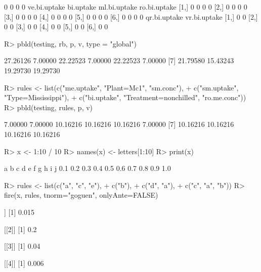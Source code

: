 \documentclass{article}\usepackage[]{graphicx}\usepackage[]{color}
\begin{document}
\begin{Schunk}
\begin{Soutput}
[6,]            0            0            0            0
     ve.bi.uptake bi.uptake ml.bi.uptake ro.bi.uptake
[1,]            0         0            0            0
[2,]            0         0            0            0
[3,]            0         0            0            0
[4,]            0         0            0            0
[5,]            0         0            0            0
[6,]            0         0            0            0
     qr.bi.uptake vr.bi.uptake
[1,]            0            0
[2,]            0            0
[3,]            0            0
[4,]            0            0
[5,]            0            0
[6,]            0            0
\end{Soutput}
%
% --end: "pbld5"
\end{Schunk}

\begin{Schunk}
% --begin: "pbld6"
\begin{Sinput}
R> pbld(testing, rb, p, v, type = "global")
\end{Sinput}
\begin{Soutput}
 [1] 27.26126  7.00000 22.22523  7.00000 22.22523  7.00000
 [7] 21.79580 15.43243 19.29730 19.29730
\end{Soutput}
%
% --end: "pbld6"
\end{Schunk}

\begin{Schunk}
% --begin: "pbld_custom"
\begin{Sinput}
R> rules <- list(c("me.uptake", "Plant=Mc1", "sm.conc"),
+                c("sm.uptake", "Type=Mississippi"),
+                c("bi.uptake", "Treatment=nonchilled", "ro.me.conc"))
R> pbld(testing, rules, p, v)
\end{Sinput}
\begin{Soutput}
 [1]  7.00000  7.00000 10.16216 10.16216 10.16216  7.00000
 [7] 10.16216 10.16216 10.16216 10.16216
\end{Soutput}
%
% --end: "pbld_custom"
\end{Schunk}

\begin{Schunk}
% --begin: "fire"
\begin{Sinput}
R> x <- 1:10 / 10
R> names(x) <- letters[1:10]
R> print(x)
\end{Sinput}
\begin{Soutput}
  a   b   c   d   e   f   g   h   i   j 
0.1 0.2 0.3 0.4 0.5 0.6 0.7 0.8 0.9 1.0 
\end{Soutput}
\begin{Sinput}
R> rules <- list(c("a", "c", "e"),
+                c("b"),
+                c("d", "a"),
+                c("c", "a", "b"))
R> fire(x, rules, tnorm="goguen", onlyAnte=FALSE)
\end{Sinput}
\begin{Soutput}
[[1]]
[1] 0.015

[[2]]
[1] 0.2

[[3]]
[1] 0.04

[[4]]
[1] 0.006
\end{Soutput}
%
% --end: "fire"
\end{Schunk}
\end{document}
